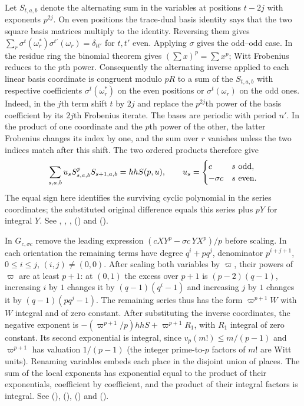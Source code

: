 Let $S_{t,a,b}$ denote the alternating sum in the variables at positions
$t-2j$ with exponents $p^{2j}$. On even positions the trace-dual basis
identity says that the two square basis matrices multiply to the
identity. Reversing them gives
$\sum_r\sigma^t(\omega_r^*)\sigma^{t'}(\omega_r)=\delta_{tt'}$
for $t,t'$ even. Applying $\sigma$ gives the odd--odd case.
In the residue ring the binomial theorem gives
$(\sum x)^p=\sum x^p$; Witt Frobenius reduces to the $p$th power.
Consequently the alternating inverse applied to each linear basis
coordinate is congruent modulo $pR$ to a sum of the $S_{t,a,b}$
with respective coefficients $\sigma^t(\omega_r^*)$ on the even
positions or $\sigma^t(\omega_r)$ on the odd ones. Indeed, in the
$j$th term shift $t$ by $2j$ and replace the $p^{2j}$th power of
the basis coefficient by its $2j$th Frobenius iterate. The bases
are periodic with period $n'$. In the product of one coordinate
and the $p$th power of the other, the latter Frobenius changes its
index by one, and the sum over $r$ vanishes unless the two indices
match after this shift. The two ordered products therefore give
\[
 \sum_{s,a,b}u_s S_{s,a,b}^{p} S_{s+1,a,b}
       =hhS(p,u),\qquad
  u_s=\begin{cases}c&s\ {\rm odd},\\-\sigma c&s\ {\rm even}.
       \end{cases}
\]
The equal sign here identifies the surviving cyclic polynomial in
the series coordinates; the substituted original difference equals
this series plus $pY$ for integral $Y$. See ,
, , 
() and
 ().

In $G_{c,\sigma c}$ remove the leading expression
$(c X Y^p-\sigma c\,Y X^p)/p$ before scaling. In each orientation
the remaining terms have degree $q^i+p q^j$, denominator
$p^{i+j+1}$, $0\le i\le j$, $(i,j)\ne(0,0)$. After scaling both
variables by $\varpi$, their powers of $\varpi$ are at least $p+1$:
at $(0,1)$ the excess over $p+1$ is $(p-2)(q-1)$, increasing $i$
by $1$ changes it by $(q-1)(q^i-1)$ and increasing $j$ by $1$
changes it by $(q-1)(p q^j-1)$. The remaining series thus has the
form $\varpi^{p+1}W$ with $W$ integral and of zero constant.
After substituting the inverse coordinates, the negative exponent is
$-(\varpi^{p+1}/p)hhS+\varpi^{p+1}R_1$, with $R_1$ integral of zero
constant. Its second exponential is integral, since
$v_p(m!)\le m/(p-1)$ and $\varpi^{p+1}$ has valuation $1/(p-1)$
(the integer prime-to-$p$ factors of $m!$ are Witt units).
Renaming variables embeds each place in the disjoint union of places.
The sum of the local exponents has exponential equal to the product
of their exponentials, coefficient by coefficient, and the product of
their integral factors is integral. See
(),
 (),
 ()
and  ().

